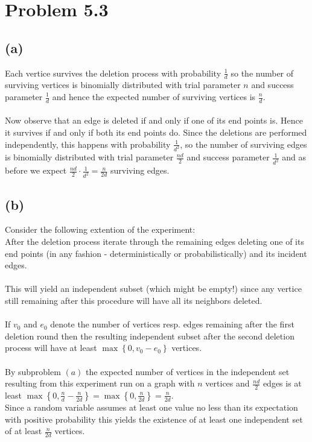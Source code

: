 \section*{Problem 5.3}
\subsection*{(a)}

Each vertice survives the deletion process with probability $\frac{1}{d}$
so the number of surviving vertices is binomially distributed 
with trial parameter $n$ and success parameter $\frac{1}{d}$ and hence the expected number of surviving vertices
is $\frac{n}{d}$. \\ \\
Now observe that an edge is deleted if and only if one of its end points is. 
Hence it survives if and only if both its end points do. 
Since the deletions are performed independently, this happens with probability $\frac{1}{d^2}$,
so the number of surviving edges is binomially distributed
with trial parameter $\frac{nd}{2}$ and success parameter $\frac{1}{d^2}$ and as before we expect
$\frac{nd}{2}\cdot \frac{1}{d^2}=\frac{n}{2d}$ surviving edges.

\subsection*{(b)}
Consider the following extention of the experiment: \\
After the deletion process iterate through the remaining edges
deleting one of its end points (in any fashion - deterministically or probabilistically)
and its incident edges. \\ \\
This will yield an independent subset (which might be empty!) 
since any vertice still remaining after this procedure will have all its neighbors deleted. \\ \\
If $v_0$ and $e_0$ denote the number of vertices resp. edges remaining after the first deletion round
then the resulting independent subset after the second deletion process will have at least
$\max\left\{ 0, v_0-e_0 \right\}$ vertices. \\ \\
By subproblem $(a)$ the expected number of vertices in the independent set resulting from this experiment
run on a graph with $n$ vertices and $\frac{nd}{2}$ edges is at least
$\max\left\{ 0, \frac{n}{d}-\frac{n}{2d} \right\}=\max\left\{ 0, \frac{n}{2d} \right\}=\frac{n}{2d}$. \\
Since a random variable assumes at least one value no less than its expectation with positive probability
this yields the existence of at least one independent set of at least $\frac{n}{2d}$ vertices.
